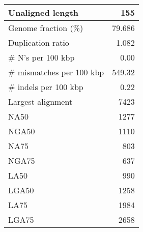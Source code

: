 \documentclass[12pt,a4paper]{article}
\begin{document}
\begin{table}[ht]
\begin{center}
\begin{tabular}{|l*{1}{|r}|}
Unaligned length & 155 \\ \hline
Genome fraction (\%) & 79.686 \\ \hline
Duplication ratio & 1.082 \\ \hline
\# N's per 100 kbp & 0.00 \\ \hline
\# mismatches per 100 kbp & 549.32 \\ \hline
\# indels per 100 kbp & 0.22 \\ \hline
Largest alignment & 7423 \\ \hline
NA50 & 1277 \\ \hline
NGA50 & 1110 \\ \hline
NA75 & 803 \\ \hline
NGA75 & 637 \\ \hline
LA50 & 990 \\ \hline
LGA50 & 1258 \\ \hline
LA75 & 1984 \\ \hline
LGA75 & 2658 \\ \hline
\end{tabular}
\end{center}
\end{table}
\end{document}
